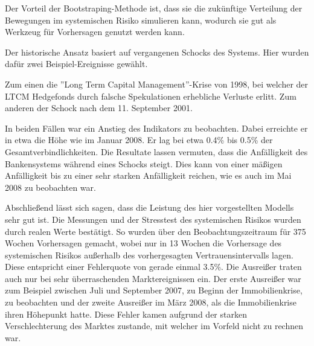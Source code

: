 \documentclass[a4paper,12pt]{scrartcl}
\begin{document}
Der Vorteil der Bootstraping-Methode ist, dass sie die zukünftige Verteilung der Bewegungen im systemischen Risiko simulieren kann, wodurch sie gut als Werkzeug für Vorhersagen genutzt werden kann. 

Der historische Ansatz basiert auf vergangenen Schocks des Systems. Hier wurden dafür zwei Beispiel-Ereignisse gewählt. 

Zum einen die ''Long Term Capital Management''-Krise von 1998, bei welcher der LTCM Hedgefonds durch falsche Spekulationen erhebliche Verluste erlitt. Zum anderen der Schock nach dem 11. September 2001.

In beiden Fällen war ein Anstieg des Indikators zu beobachten. Dabei erreichte er in etwa die Höhe wie im Januar 2008. Er lag bei etwa 0.4\% bis 0.5\% der Gesamtverbindlichkeiten.
Die Resultate lassen vermuten, dass die Anfälligkeit des Bankensystems während eines Schocks steigt. Dies kann von einer mäßigen Anfälligkeit bis zu einer sehr starken Anfälligkeit reichen, wie es auch im Mai 2008 zu beobachten war. 



Abschließend lässt sich sagen, dass die Leistung des hier vorgestellten Modells sehr gut ist. Die Messungen und der Stresstest des systemischen Risikos wurden durch realen Werte bestätigt. So wurden über den Beobachtungszeitraum für 375 Wochen Vorhersagen gemacht, wobei nur in 13 Wochen die Vorhersage des systemischen Risikos außerhalb des vorhergesagten Vertrauensintervalls lagen. Diese entspricht einer Fehlerquote von gerade einmal 3.5\%.
Die Ausreißer traten auch nur bei sehr überraschenden Marktereignissen ein.  Der erste Ausreißer war zum Beispiel zwischen Juli und September 2007, zu Beginn der Immobilienkrise, zu beobachten und der zweite Ausreißer im März 2008, als die Immobilienkrise ihren Höhepunkt hatte. Diese Fehler kamen aufgrund der starken Verschlechterung des Marktes zustande, mit welcher im Vorfeld nicht zu rechnen war. 
\end{document}
